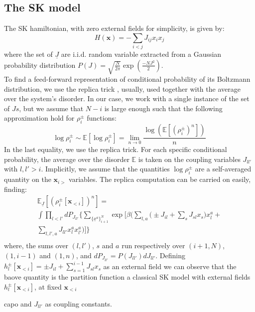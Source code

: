 \subsection{The SK model}
The SK hamiltonian, with zero external fields for simplicity, is given by:
\begin{equation}
H\left(\mathbf{x}\right)=-\sum_{i<j}J_{ij}x_{i}x_{j}
\end{equation}
where the set of $\underline{J}$ are i.i.d. random variable extracted from a Gaussian probability distribution $P(J)=\sqrt{\frac{N}{2\pi}}\exp\left(\frac{-NJ^2}{2} \right)$. \\
To find a feed-forward representation of conditional probability of its Boltzmann distribution, we use the replica trick \cite{10.1142/0271}, usually, used together with the average over the system's disorder. In our case, we work with a single instance of the set of $Js$, but we assume that $N-i$ is large enough such that the following approximation hold for $\rho_i^{\pm}$ functions: 
\[
\log\rho_i^{\pm} \sim \mathbb{E}\left[  \log\rho_i^{\pm} \right] = \lim_{n\rightarrow 0} \frac{  \log(\mathbb{E}\left[(\rho_i^{\pm})^n \right])}{n}
\]
In the last equality, we use the replica trick. 
For each specific conditional probability, the average over the disorder $\mathbb{E}$ is taken on the coupling variables $J_{ll'}$ with $l,l'>i$. Implicitly, we assume that the quantities $\log\rho_i^{\pm}$ are a self-averaged quantity on the $\mathbf{x}_{i>}$ variables.
 The replica computation can be carried on easily, finding:
\begin{multline}
\mathbb{E}_{\underline{J}}\left[(\rho_i^{\pm}[\mathbf{x}_{<i}])^n \right]  = \\
\int \prod_{l<l'} dP_{J_{ll'}} \bigg\{ 
\sum_{\{\underline{x}^{a}\}_{i+1}^N} \exp\bigg[\beta \bigg(
\sum_{l,a}\bigg( \pm J_{il} + \sum_{s} J_{sl} x_s \bigg) x_l^{a} + \\
\sum_{l,l', a} J_{ll'} x_l^{a} x_{l'}^{a}
\bigg)  \bigg] 
\bigg\}\\
\end{multline}
where, the sums over $(l,l')$, $s$ and $a$ run respectively over $(i+1,N)$, $(1,i-1)$ and $(1,n)$, and $dP_{J_{ll'}}=P(J_{ll'})dJ_{ll'}$. Defining $h_l^{\pm}[\mathbf{x}_{<i}] =\pm J_{il} + \sum_{s=1}^{i-1} J_{sl} x_s$ as an external field we can observe that the baove quantity is the partition function a classical SK model with external fields $h_l^{\pm}[\mathbf{x}_{<i}]$, at fixed $\mathbf{x}_{<i}$

capo
and $J_{ll'}$ as coupling constants. \\  

